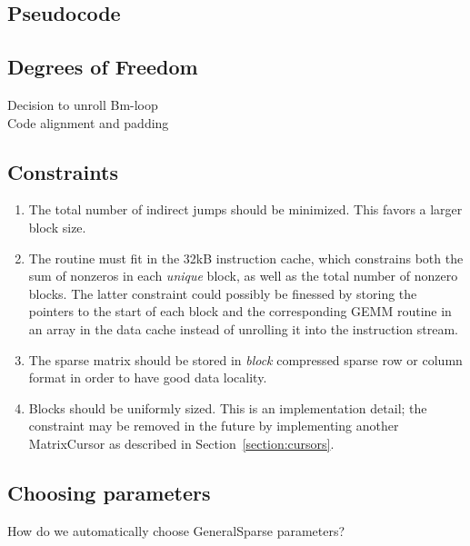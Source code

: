 \subsection{Pseudocode}


\subsection{Degrees of Freedom}
\begin{description}
  \item[Decision to unroll Bm-loop] 
  \item[Code alignment and padding]
\end{description}


\subsection{Constraints}

\begin{enumerate}

  \item The total number of indirect jumps should be minimized. This favors a larger block size.

  \item The routine must fit in the 32kB instruction cache, which constrains both the sum of nonzeros in each \emph{unique} block, as well as the total number of nonzero blocks. The latter constraint could possibly be finessed by storing the pointers to the start of each block and the corresponding GEMM routine in an array in the data cache instead of unrolling it into the instruction stream.

  \item The sparse matrix should be stored in \emph{block} compressed sparse row or column format in order to have good data locality.

  \item Blocks should be uniformly sized. This is an implementation detail; the constraint may be removed in the future by implementing another MatrixCursor as described in Section~\ref{section:cursors}.

\end{enumerate}

\subsection{Choosing parameters}

How do we automatically choose GeneralSparse parameters?


